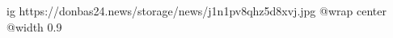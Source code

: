  
 
 
 
 

\ifcmt
  ig https://donbas24.news/storage/news/j1n1pv8qhz5d8xvj.jpg
  @wrap center
  @width 0.9
\fi
